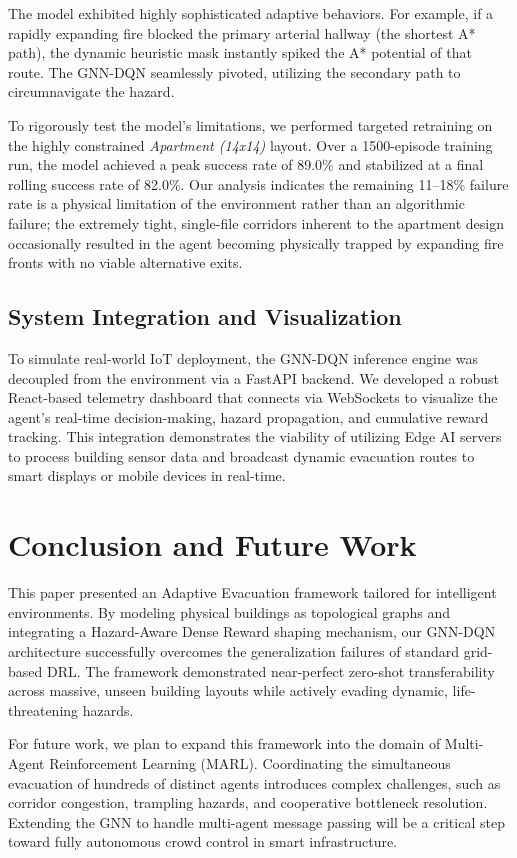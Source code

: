 \documentclass[conference]{IEEEtran}
\begin{document}
The model exhibited highly sophisticated adaptive behaviors. For example, if a rapidly expanding fire blocked the primary arterial hallway (the shortest A* path), the dynamic heuristic mask instantly spiked the A* potential of that route. The GNN-DQN seamlessly pivoted, utilizing the secondary path to circumnavigate the hazard. 

To rigorously test the model's limitations, we performed targeted retraining on the highly constrained \textit{Apartment (14x14)} layout. Over a 1500-episode training run, the model achieved a peak success rate of 89.0\% and stabilized at a final rolling success rate of 82.0\%. Our analysis indicates the remaining 11--18\% failure rate is a physical limitation of the environment rather than an algorithmic failure; the extremely tight, single-file corridors inherent to the apartment design occasionally resulted in the agent becoming physically trapped by expanding fire fronts with no viable alternative exits.

\subsection{System Integration and Visualization}
To simulate real-world IoT deployment, the GNN-DQN inference engine was decoupled from the environment via a FastAPI backend. We developed a robust React-based telemetry dashboard that connects via WebSockets to visualize the agent's real-time decision-making, hazard propagation, and cumulative reward tracking. This integration demonstrates the viability of utilizing Edge AI servers to process building sensor data and broadcast dynamic evacuation routes to smart displays or mobile devices in real-time.

\section{Conclusion and Future Work}
\label{sec:conclusion}
This paper presented an Adaptive Evacuation framework tailored for intelligent environments. By modeling physical buildings as topological graphs and integrating a Hazard-Aware Dense Reward shaping mechanism, our GNN-DQN architecture successfully overcomes the generalization failures of standard grid-based DRL. The framework demonstrated near-perfect zero-shot transferability across massive, unseen building layouts while actively evading dynamic, life-threatening hazards.

For future work, we plan to expand this framework into the domain of Multi-Agent Reinforcement Learning (MARL). Coordinating the simultaneous evacuation of hundreds of distinct agents introduces complex challenges, such as corridor congestion, trampling hazards, and cooperative bottleneck resolution. Extending the GNN to handle multi-agent message passing will be a critical step toward fully autonomous crowd control in smart infrastructure.



\end{document}
